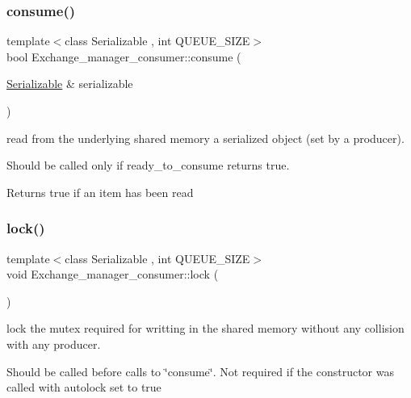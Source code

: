 \subsubsection{\texorpdfstring{consume()}{consume()}}
{\footnotesize\ttfamily template$<$class Serializable , int Q\+U\+E\+U\+E\+\_\+\+S\+I\+ZE$>$ \\
bool Exchange\+\_\+manager\+\_\+consumer\+::consume (\begin{DoxyParamCaption}\item[{\hyperlink{classSerializable}{Serializable} \&}]{serializable }\end{DoxyParamCaption})}



read from the underlying shared memory a serialized object (set by a producer). 

Should be called only if ready\+\_\+to\+\_\+consume returns true. \begin{DoxyReturn}{Returns}
true if an item has been read 
\end{DoxyReturn}
\mbox{\label{classshared__memory_1_1Exchange__manager__consumer_a1ec59bb41c9de78eb891ea70efe6b8c2}} 
\subsubsection{\texorpdfstring{lock()}{lock()}}
{\footnotesize\ttfamily template$<$class Serializable , int Q\+U\+E\+U\+E\+\_\+\+S\+I\+ZE$>$ \\
void Exchange\+\_\+manager\+\_\+consumer\+::lock (\begin{DoxyParamCaption}{ }\end{DoxyParamCaption})}



lock the mutex required for writting in the shared memory without any collision with any producer. 

Should be called before calls to \char`\"{}consume\char`\"{}. Not required if the constructor was called with autolock set to true \mbox{\label{classshared__memory_1_1Exchange__manager__consumer_ab8651cff750b5cb2ceae97a97b2c7f2d}} 
